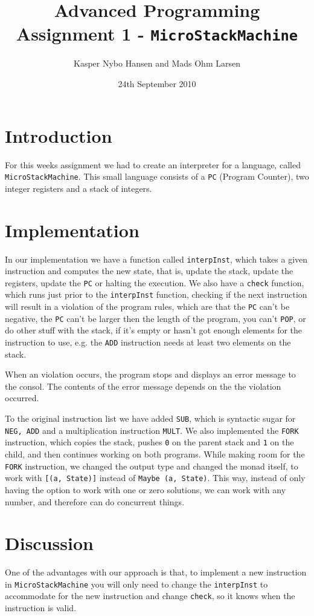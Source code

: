 \documentclass[10pt, a4paper]{article}
\title{Advanced Programming \\\small{Assignment 1} - \texttt{MicroStackMachine}}
\author{Kasper Nybo Hansen and Mads Ohm Larsen}
\date{24th September 2010}
\begin{document}
	
\maketitle
\section{Introduction}
For this weeks assignment we had to create an interpreter for a language, called \texttt{MicroStackMachine}.
This small language consists of a \texttt{PC} (Program Counter), two integer registers and a stack of integers.

\section{Implementation}
In our implementation we have a function called \texttt{interpInst}, which takes a given instruction and computes the new state, that is, update the stack, update the registers, update the \texttt{PC} or halting the execution.
We also have a \texttt{check} function, which runs just prior to the \texttt{interpInst} function, checking if the next instruction will result in a violation of the program rules, which are that the \texttt{PC} can't be negative, the \texttt{PC} can't be larger then the length of the program, you can't \texttt{POP}, or do other stuff with the stack, if it's empty or hasn't got enough elements for the instruction to use, e.g. the \texttt{ADD} instruction needs at least two elements on the stack.

When an violation occurs, the program stops and displays an error message to the consol. The contents of the error message depends on the the violation occurred.

To the original instruction list we have added \texttt{SUB}, which is syntactic sugar for \texttt{NEG, ADD} and a multiplication instruction \texttt{MULT}.
We also implemented the \texttt{FORK} instruction, which copies the stack, pushes \texttt{0} on the parent stack and \texttt{1} on the child, and then continues working on both programs. 
While making room for the \texttt{FORK} instruction, we changed the output type and changed the monad itself, to work with \texttt{[(a, State)]} instead of \texttt{Maybe (a, State)}. 
This way, instead of only having the option to work with one or zero solutions, we can work with any number, and therefore can do concurrent things.



\section{Discussion}
One of the advantages with our approach is that, to implement a new instruction in \texttt{MicroStackMachine} you will only need to change the \texttt{interpInst} to accommodate for the new instruction and change \texttt{check}, so it knows when the instruction is valid.
\end{document}
